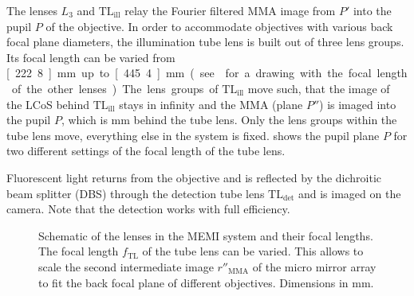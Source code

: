 The lenses $L_3$ and $\textrm{TL}_\textrm{ill}$ relay the Fourier
filtered MMA image from $P'$ into the pupil $P$ of the objective. In
order to accommodate objectives with various back focal plane
diameters, the illumination tube lens is built out of three lens
groups. Its focal length can be varied from \unit[222.8]{mm} up to
\unit[445.4]{mm} (see  for a drawing with the
focal length of the other lenses). The lens groups of
$\textrm{TL}_\textrm{ill}$ move such, that the image of the LCoS
behind $\textrm{TL}_\textrm{ill}$ stays in infinity and the MMA
(plane $P''$) is imaged into the pupil $P$, which is \unit[250]{mm}
behind the tube lens. Only the lens groups within the tube lens
move, everything else in the system is
fixed.  shows the pupil plane $P$ for two
different settings of the focal length of the tube lens.

Fluorescent light returns from the objective and is reflected by the
dichroitic beam splitter (DBS) through the detection tube lens
$\textrm{TL}_\textrm{det}$ and is imaged on the camera. Note that the
detection works with full efficiency.

\begin{figure}
   \centering
   \def\svgscale{2}
   
   \caption{Schematic of the lenses in the MEMI system and their focal
     lengths. The focal length $f_\textrm{TL}$ of the tube lens can be
     varied. This allows to scale the second intermediate image
     $r''_\textrm{MMA}$ of the micro mirror array to fit the back
     focal plane of different objectives. Dimensions in mm.}
   \label{fig:memi-sketch}
 \end{figure}
 



